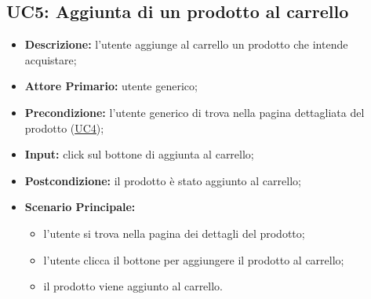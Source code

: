 \subsection{UC5: Aggiunta di un prodotto al carrello}
\label{sec:UC5}
\begin{itemize}
    \item \textbf{Descrizione:} l'utente aggiunge al carrello un prodotto che intende acquistare;
    \item \textbf{Attore Primario:} utente generico;
    \item \textbf{Precondizione:} l'utente generico di trova nella pagina dettagliata del prodotto (\hyperref[sec:UC4]{\underline{UC4}});
    \item \textbf{Input:} click sul bottone di aggiunta al carrello;
    \item \textbf{Postcondizione:} il prodotto è stato aggiunto al carrello;
    \item \textbf{Scenario Principale:}
          \begin{itemize}
              \item l'utente si trova nella pagina dei dettagli del prodotto;
              \item l'utente clicca il bottone per aggiungere il prodotto al carrello;
              \item il prodotto viene aggiunto al carrello.
          \end{itemize}
\end{itemize}
